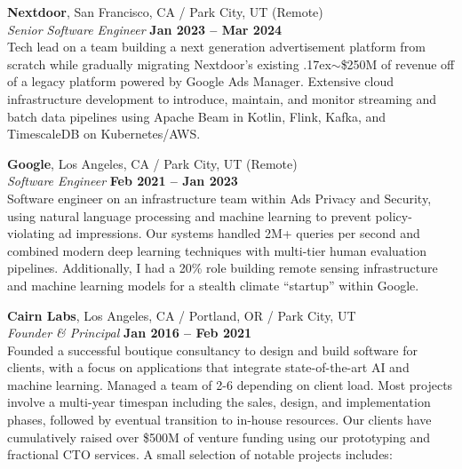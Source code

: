 \documentclass[margin,line]{resume}
\begin{document}
\begin{resume}
    \textbf{Nextdoor}, San Francisco, CA / Park City, UT (Remote)  \vspace{2mm}\\\vspace{1mm}%
    \textsl{Senior Software Engineer} \hfill \textbf{Jan 2023 -- Mar 2024}\\
    Tech lead on a team building a next generation advertisement platform from
    scratch while gradually migrating Nextdoor's existing
    {\raise.17ex\hbox{$\scriptstyle\sim$}}\$250M of revenue off of a legacy
    platform powered by Google Ads Manager. Extensive cloud infrastructure
    development to introduce, maintain, and monitor streaming and batch data
    pipelines using Apache Beam in Kotlin, Flink, Kafka, and TimescaleDB on
    Kubernetes/AWS.

    \textbf{Google}, Los Angeles, CA / Park City, UT (Remote)  \vspace{2mm}\\\vspace{1mm}%
    \textsl{Software Engineer} \hfill \textbf{Feb 2021 -- Jan 2023}\\
    Software engineer on an infrastructure team within Ads Privacy and Security,
    using natural language processing and machine learning to prevent
    policy-violating ad impressions. Our systems handled 2M+ queries per second
    and combined modern deep learning techniques with multi-tier human
    evaluation pipelines. Additionally, I had a 20\% role building
    remote sensing infrastructure and machine learning models for a stealth
    climate ``startup'' within Google.

    \textbf{Cairn Labs}, Los Angeles, CA / Portland, OR / Park City, UT \vspace{2mm}\\\vspace{1mm}%
    \textsl{Founder \& Principal} \hfill \textbf{Jan 2016 -- Feb 2021}\\
    Founded a successful boutique consultancy to design and build software
    for clients, with a focus on applications that integrate state-of-the-art
    AI and machine learning. Managed a team of 2-6 depending on client load.
    Most projects involve a multi-year timespan including the sales, design, and
    implementation phases, followed by eventual transition to in-house
    resources. Our clients have cumulatively raised over \$500M of venture
    funding using our prototyping and fractional CTO services. A small selection
    of notable projects includes:


\end{resume}
\end{document}
